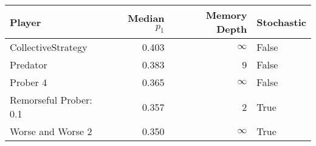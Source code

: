 \begin{tabular}{lrrl}
\toprule
                 Player &  Median $p_1$ &  Memory Depth & Stochastic \\
\midrule
     CollectiveStrategy &         0.403 &            \(\infty\) &      False \\
               Predator &         0.383 &             9 &      False \\
               Prober 4 &         0.365 &            \(\infty\) &      False \\
 Remorseful Prober: 0.1 &         0.357 &             2 &       True \\
      Worse and Worse 2 &         0.350 &            \(\infty\) &       True \\
\bottomrule
\end{tabular}
